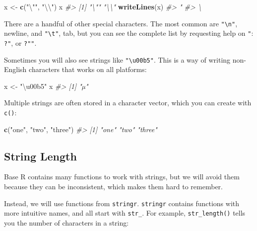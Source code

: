 \documentclass[]{book}
\newenvironment{Shaded}{\begin{snugshade}}{\end{snugshade}}
\newcommand{\KeywordTok}[1]{\textcolor[rgb]{0.13,0.29,0.53}{\textbf{#1}}}
\newcommand{\CharTok}[1]{\textcolor[rgb]{0.31,0.60,0.02}{#1}}
\newcommand{\StringTok}[1]{\textcolor[rgb]{0.31,0.60,0.02}{#1}}
\newcommand{\CommentTok}[1]{\textcolor[rgb]{0.56,0.35,0.01}{\textit{#1}}}
\newcommand{\NormalTok}[1]{#1}
\begin{document}
\begin{Shaded}
\begin{Highlighting}[]
\NormalTok{x <-}\StringTok{ }\KeywordTok{c}\NormalTok{(}\StringTok{"}\CharTok{\textbackslash{}"}\StringTok{"}\NormalTok{, }\StringTok{"}\CharTok{\textbackslash{}\textbackslash{}}\StringTok{"}\NormalTok{)}
\NormalTok{x}
\CommentTok{#> [1] "\textbackslash{}"" "\textbackslash{}\textbackslash{}"}
\KeywordTok{writeLines}\NormalTok{(x)}
\CommentTok{#> "}
\CommentTok{#> \textbackslash{}}
\end{Highlighting}
\end{Shaded}

There are a handful of other special characters. The most common are
\texttt{"\textbackslash{}n"}, newline, and \texttt{"\textbackslash{}t"},
tab, but you can see the complete list by requesting help on \texttt{"}:
\texttt{?\textquotesingle{}"\textquotesingle{}}, or
\texttt{?"\textquotesingle{}"}.

Sometimes you will also see strings like
\texttt{"\textbackslash{}u00b5"}. This is a way of writing non-English
characters that works on all platforms:

\begin{Shaded}
\begin{Highlighting}[]
\NormalTok{x <-}\StringTok{ "\textbackslash{}u00b5"}
\NormalTok{x}
\CommentTok{#> [1] "µ"}
\end{Highlighting}
\end{Shaded}

Multiple strings are often stored in a character vector, which you can
create with \texttt{c()}:

\begin{Shaded}
\begin{Highlighting}[]
\KeywordTok{c}\NormalTok{(}\StringTok{"one"}\NormalTok{, }\StringTok{"two"}\NormalTok{, }\StringTok{"three"}\NormalTok{)}
\CommentTok{#> [1] "one"   "two"   "three"}
\end{Highlighting}
\end{Shaded}

\subsection{String Length}\label{string-length}

Base R contains many functions to work with strings, but we will avoid
them because they can be inconsistent, which makes them hard to
remember.

Instead, we will use functions from \texttt{stringr}. \texttt{stringr}
contains functions with more intuitive names, and all start with
\texttt{str\_}. For example, \texttt{str\_length()} tells you the number
of characters in a string:
\end{document}
